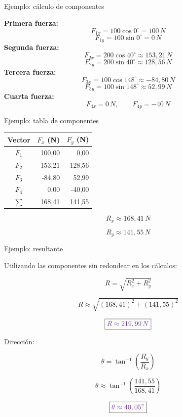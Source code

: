 \documentclass[aspectratio=169,11pt]{beamer}
\newcommand{\resp}[1]{
 \[
 \boxed{\color{morado}{#1}}
 \]
}
\begin{document}
\begin{frame}{Ejemplo: cálculo de componentes}

\small

\textbf{Primera fuerza:}
\[
F_{1x}=100\cos0^\circ=100\,N
\]
\[
F_{1y}=100\sin0^\circ=0\,N
\]
\textbf{Segunda fuerza:}
\[
F_{2x}=200\cos40^\circ
\approx153,21\,N
\]
\[
F_{2y}=200\sin40^\circ
\approx128,56\,N
\]
\textbf{Tercera fuerza:}
\[
F_{3x}=100\cos148^\circ
\approx-84,80\,N
\]
\[
F_{3y}=100\sin148^\circ
\approx52,99\,N
\]
\textbf{Cuarta fuerza:}
\[
F_{4x}=0\,N,\qquad F_{4y}=-40\,N
\]

\end{frame}

\begin{frame}{Ejemplo: tabla de componentes}

\begin{center}
\renewcommand{\arraystretch}{1.5}

\begin{tabular}{|c|r|r|}
\hline
Vector & \(F_x\) (N) & \(F_y\) (N)\\
\hline
\(F_1\) & 100,00 & 0,00\\
\hline
\(F_2\) & 153,21 & 128,56\\
\hline
\(F_3\) & -84,80 & 52,99\\
\hline
\(F_4\) & 0,00 & -40,00\\
\hline
\(\sum\) & 168,41 & 141,55\\
\hline
\end{tabular}
\end{center}

\[
R_x\approx168,41\,N
\]

\[
R_y\approx141,55\,N
\]

\end{frame}

\begin{frame}{Ejemplo: resultante}

Utilizando las componentes
sin redondear en los cálculos:

\[
R=\sqrt{R_x^2+R_y^2}
\]

\[
R\approx
\sqrt{(168,41)^2+(141,55)^2}
\]

\resp{R\approx219,99\,N}

Dirección:

\[
\theta=
\tan^{-1}\left(\frac{R_y}{R_x}\right)
\]

\[
\theta\approx
\tan^{-1}\left(\frac{141,55}{168,41}\right)
\]

\resp{\theta\approx40,05^\circ}

\end{frame}
\end{document}
